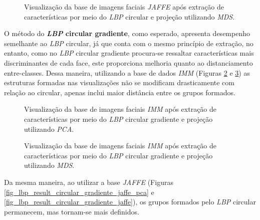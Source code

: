 \documentclass[conference]{IEEEtran}
\begin{document}
\begin{figure}[h]
\center
\leavevmode
{}
\qquad
{}
\caption{Visualização da base de imagens faciais \textit{JAFFE} após extração de características por meio do \textit{LBP} circular e projeção utilizando \textit{MDS}.}
 \label{fig_lbp_result_circular_jaffe}
\end{figure}

O método do \textbf{\textit{LBP} circular gradiente}, como esperado, apresenta desempenho semelhante ao \textit{LBP} circular, já que conta com o mesmo princípio de extração, no entanto, como no \textit{LBP} circular gradiente procura-se ressaltar características mais discriminantes de cada face, este proporciona melhoria quanto ao distanciamento entre-classes. Dessa maneira, utilizando a base de dados \textit{IMM} (Figuras \ref{fig_lbp_result_circular_gradiente_imm_pca} e \ref{fig_lbp_result_circular_gradiente_imm}) as estruturas formadas nas visualizações não se modificam drasticamente com relação ao circular, apenas inclui maior distância entre os grupos formados. 

\begin{figure}[h]
\center
\leavevmode
{}
\qquad
{}
\caption{Visualização da base de imagens faciais \textit{IMM} após extração de características por meio do \textit{LBP} circular gradiente e projeção utilizando \textit{PCA}.}
 \label{fig_lbp_result_circular_gradiente_imm_pca}
\end{figure}

\begin{figure}[h]
\center
\leavevmode
{}
\qquad
{}
\caption{Visualização da base de imagens faciais \textit{IMM} após extração de características por meio do \textit{LBP} circular gradiente e projeção utilizando \textit{MDS}.}
 \label{fig_lbp_result_circular_gradiente_imm}
\end{figure}

Da mesma maneira, ao utilizar a base \textit{JAFFE} (Figuras \ref{fig_lbp_result_circular_gradiente_jaffe_pca} e \ref{fig_lbp_result_circular_gradiente_jaffe}), os grupos formados pelo \textit{LBP} circular permanecem, mas tornam-se mais definidos.
\end{document}
